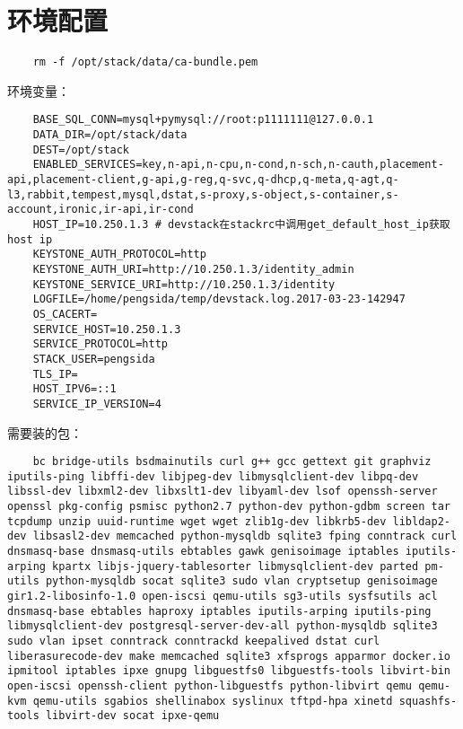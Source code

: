 \documentclass[a4paper,left=1.5cm,right=1.5cm,11pt]{article}
\begin{document}
\tableofcontents

\clearpage

\section{环境配置}
	\begin{lstlisting}
	rm -f /opt/stack/data/ca-bundle.pem
	\end{lstlisting}

	环境变量：
	\begin{lstlisting}
	BASE_SQL_CONN=mysql+pymysql://root:p1111111@127.0.0.1
	DATA_DIR=/opt/stack/data
	DEST=/opt/stack
	ENABLED_SERVICES=key,n-api,n-cpu,n-cond,n-sch,n-cauth,placement-api,placement-client,g-api,g-reg,q-svc,q-dhcp,q-meta,q-agt,q-l3,rabbit,tempest,mysql,dstat,s-proxy,s-object,s-container,s-account,ironic,ir-api,ir-cond
	HOST_IP=10.250.1.3 # devstack在stackrc中调用get_default_host_ip获取host ip
	KEYSTONE_AUTH_PROTOCOL=http
	KEYSTONE_AUTH_URI=http://10.250.1.3/identity_admin
	KEYSTONE_SERVICE_URI=http://10.250.1.3/identity
	LOGFILE=/home/pengsida/temp/devstack.log.2017-03-23-142947
	OS_CACERT=
	SERVICE_HOST=10.250.1.3
	SERVICE_PROTOCOL=http
	STACK_USER=pengsida
	TLS_IP=
	HOST_IPV6=::1
	SERVICE_IP_VERSION=4
	\end{lstlisting}

	需要装的包：
	\begin{lstlisting}
	bc bridge-utils bsdmainutils curl g++ gcc gettext git graphviz iputils-ping libffi-dev libjpeg-dev libmysqlclient-dev libpq-dev libssl-dev libxml2-dev libxslt1-dev libyaml-dev lsof openssh-server openssl pkg-config psmisc python2.7 python-dev python-gdbm screen tar tcpdump unzip uuid-runtime wget wget zlib1g-dev libkrb5-dev libldap2-dev libsasl2-dev memcached python-mysqldb sqlite3 fping conntrack curl dnsmasq-base dnsmasq-utils ebtables gawk genisoimage iptables iputils-arping kpartx libjs-jquery-tablesorter libmysqlclient-dev parted pm-utils python-mysqldb socat sqlite3 sudo vlan cryptsetup genisoimage gir1.2-libosinfo-1.0 open-iscsi qemu-utils sg3-utils sysfsutils acl dnsmasq-base ebtables haproxy iptables iputils-arping iputils-ping libmysqlclient-dev postgresql-server-dev-all python-mysqldb sqlite3 sudo vlan ipset conntrack conntrackd keepalived dstat curl liberasurecode-dev make memcached sqlite3 xfsprogs apparmor docker.io ipmitool iptables ipxe gnupg libguestfs0 libguestfs-tools libvirt-bin open-iscsi openssh-client python-libguestfs python-libvirt qemu qemu-kvm qemu-utils sgabios shellinabox syslinux tftpd-hpa xinetd squashfs-tools libvirt-dev socat ipxe-qemu
	\end{lstlisting}
\end{document}
